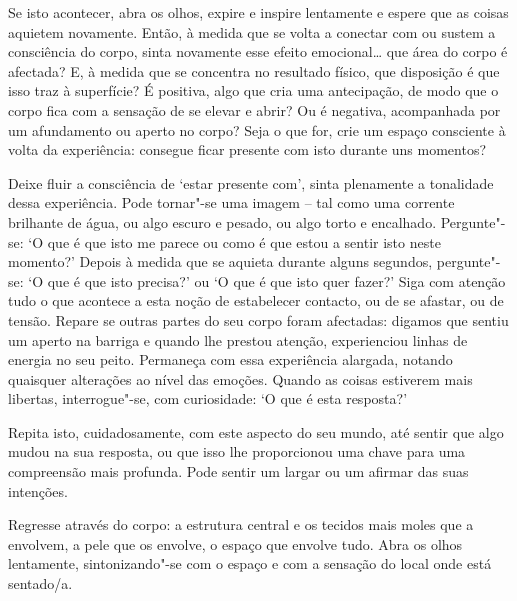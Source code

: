 Se isto acontecer, abra os olhos, expire e inspire lentamente e espere que as
coisas aquietem novamente. Então, à medida que se volta a conectar com ou sustem
a consciência do corpo, sinta novamente esse efeito emocional\ldots{} que área
do corpo é afectada? E, à medida que se concentra no resultado físico, que
disposição é que isso traz à superfície? É positiva, algo que cria uma
antecipação, de modo que o corpo fica com a sensação de se elevar e abrir? Ou é
negativa, acompanhada por um afundamento ou aperto no corpo? Seja o que for,
crie um espaço consciente à volta da experiência: consegue ficar presente com
isto durante uns momentos?

Deixe fluir a consciência de `estar presente com', sinta plenamente a tonalidade
dessa experiência. Pode tornar"-se uma imagem -- tal como uma corrente brilhante
de água, ou algo escuro e pesado, ou algo torto e encalhado. Pergunte"-se: `O
que é que isto me parece ou como é que estou a sentir isto neste momento?'
Depois à medida que se aquieta durante alguns segundos, pergunte"-se: `O que é
que isto precisa?' ou `O que é que isto quer fazer?' Siga com atenção tudo o que
acontece a esta noção de estabelecer contacto, ou de se afastar, ou de tensão.
Repare se outras partes do seu corpo foram afectadas: digamos que sentiu um
aperto na barriga e quando lhe prestou atenção, experienciou linhas de energia
no seu peito. Permaneça com essa experiência alargada, notando quaisquer
alterações ao nível das emoções. Quando as coisas estiverem mais libertas,
interrogue"-se, com curiosidade: `O que é esta resposta?'

Repita isto, cuidadosamente, com este aspecto do seu mundo, até sentir que algo
mudou na sua resposta, ou que isso lhe proporcionou uma chave para uma
compreensão mais profunda. Pode sentir um largar ou um afirmar das suas
intenções.

Regresse através do corpo: a estrutura central e os tecidos mais moles que a
envolvem, a pele que os envolve, o espaço que envolve tudo. Abra os olhos
lentamente, sintonizando"-se com o espaço e com a sensação do local onde está
sentado/a.

